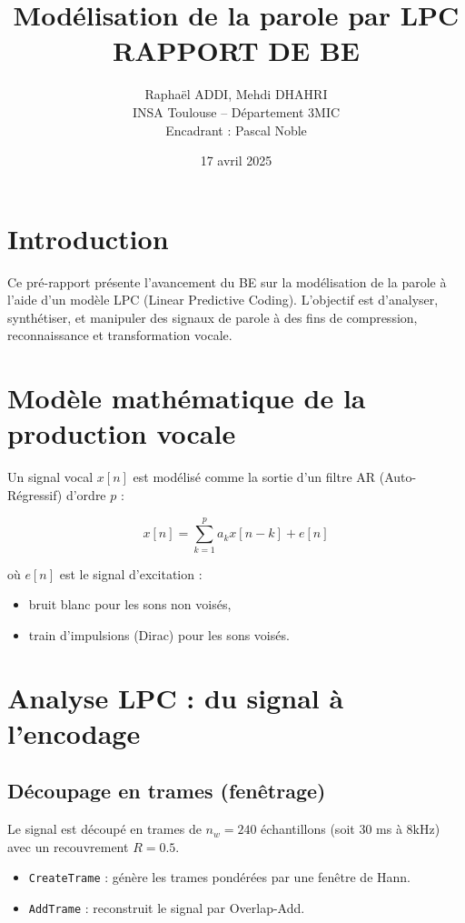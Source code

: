 \documentclass[11pt]{article}
\title{Modélisation de la parole par LPC \\[0.5em]
\large RAPPORT DE BE}
\author{Raphaël ADDI, Mehdi DHAHRI \\
INSA Toulouse – Département 3MIC \\
Encadrant : Pascal Noble}
\date{17 avril 2025}
\begin{document}
\maketitle
\thispagestyle{empty}
\newpage

\tableofcontents
\newpage

\section{Introduction}

Ce pré-rapport présente l’avancement du BE sur la modélisation de la parole à l’aide d’un modèle LPC (Linear Predictive Coding). L’objectif est d’analyser, synthétiser, et manipuler des signaux de parole à des fins de compression, reconnaissance et transformation vocale.

\section{Modèle mathématique de la production vocale}

Un signal vocal \( x[n] \) est modélisé comme la sortie d’un filtre AR (Auto-Régressif) d’ordre \( p \) :

\[
x[n] = \sum_{k=1}^{p} a_k x[n-k] + e[n]
\]

où \( e[n] \) est le signal d’excitation :
\begin{itemize}
    \item bruit blanc pour les sons non voisés,
    \item train d’impulsions (Dirac) pour les sons voisés.
\end{itemize}

\section{Analyse LPC : du signal à l'encodage}

\subsection{Découpage en trames (fenêtrage)}

Le signal est découpé en trames de \( n_w = 240 \) échantillons (soit 30 ms à 8kHz) avec un recouvrement \( R = 0.5 \).

\begin{itemize}
    \item \texttt{CreateTrame} : génère les trames pondérées par une fenêtre de Hann.
    \item \texttt{AddTrame} : reconstruit le signal par Overlap-Add.
\end{itemize}
\end{document}
